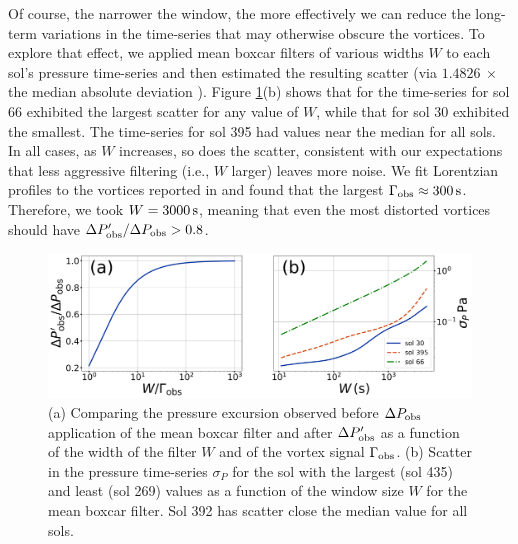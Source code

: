 \documentclass{aastex63}
\begin{document}
Of course, the narrower the window, the more effectively we can reduce the long-term variations in the time-series that may otherwise obscure the vortices. To explore that effect, we applied mean boxcar filters of various widths $W$ to each sol's pressure time-series and then estimated the resulting scatter (via $1.4826\ \times$ the median absolute deviation \citealp{doi:10.1080/01621459.1993.10476408}). Figure \ref{fig:Pobsprime-sigmaP_vs_W}(b) shows that for the time-series for sol 66 exhibited the largest scatter for any value of $W$, while that for sol 30 exhibited the smallest. The time-series for sol 395 had values near the median for all sols. In all cases, as $W$ increases, so does the scatter, consistent with our expectations that less aggressive filtering (i.e., $W$ larger) leaves more noise. We fit Lorentzian profiles to the vortices reported in \citet{2020arXiv200501134S} and found that the largest $\Gamma_{\rm obs} \approx 300\,{\rm s}$. Therefore, we took $W = 3000\,{\rm s}$, meaning that even the most distorted vortices should have $\Delta P_{\rm obs}^\prime/\Delta P_{\rm obs} > 0.8$.

\begin{figure}
    \centering
    \includegraphics[width=\textwidth]{figures/Pobsprime-sigmaP_vs_W.png}
    \caption{(a) Comparing the pressure excursion observed before $\Delta P_{\rm obs}$ application of the mean boxcar filter and after $\Delta P_{\rm obs}^\prime$ as a function of the width of the filter $W$ and of the vortex signal $\Gamma_{\rm obs}$. (b) Scatter in the pressure time-series $\sigma_P$ for the sol with the largest (sol 435) and least (sol 269) values as a function of the window size $W$ for the mean boxcar filter. Sol 392 has scatter close the median value for all sols. }
    \label{fig:Pobsprime-sigmaP_vs_W}
\end{figure}
\end{document}
